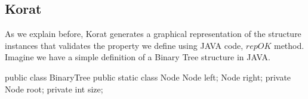 \documentclass[10pt, conference, compsocconf]{IEEEtran}
\begin{document}
%
%
%
%
%
%

\subsection{Korat}
As we explain before, Korat generates a graphical representation of the structure instances that validates the property we define using JAVA code, $repOK$ method.\\
Imagine we have a simple definition of a Binary Tree structure in JAVA.

\begin{code}
public class BinaryTree {
  public static class Node {
    Node left;
    Node right;
  }
  private Node root;
  private int size;
}
\end{code}
\end{document}
